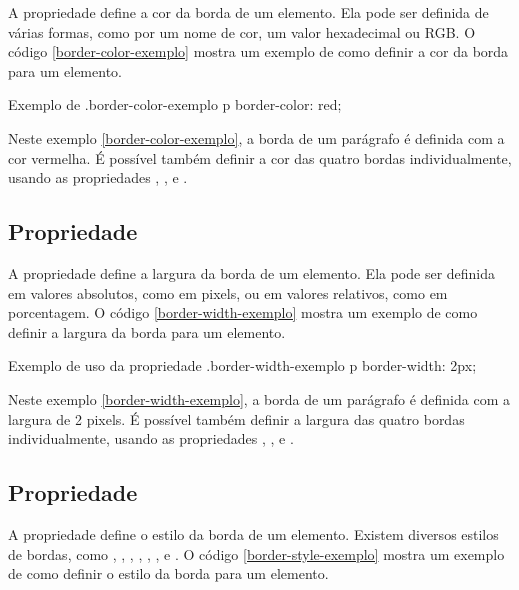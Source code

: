 A propriedade  define a cor da borda de um elemento. Ela pode ser definida de várias formas, como por um nome de cor, um valor hexadecimal ou RGB. O código \ref{border-color-exemplo} mostra um exemplo de como definir a cor da borda para um elemento.

\begin{csscode}{Exemplo de .}{border-color-exemplo}
p {
    border-color: red;
}
\end{csscode}

Neste exemplo \ref{border-color-exemplo}, a borda de um parágrafo é definida com a cor vermelha. É possível também definir a cor das quatro bordas individualmente, usando as propriedades , ,  e .

\subsection{Propriedade }

A propriedade  define a largura da borda de um elemento. Ela pode ser definida em valores absolutos, como em pixels, ou em valores relativos, como em porcentagem. O código \ref{border-width-exemplo} mostra um exemplo de como definir a largura da borda para um elemento.

\begin{csscode}{Exemplo de uso da propriedade .}{border-width-exemplo}
p {
    border-width: 2px;
}
\end{csscode}

Neste exemplo \ref{border-width-exemplo}, a borda de um parágrafo é definida com a largura de 2 pixels. É possível também definir a largura das quatro bordas individualmente, usando as propriedades , ,  e .

\subsection{Propriedade }

A propriedade  define o estilo da borda de um elemento. Existem diversos estilos de bordas, como , , , , , ,  e . O código \ref{border-style-exemplo} mostra um exemplo de como definir o estilo da borda para um elemento.

